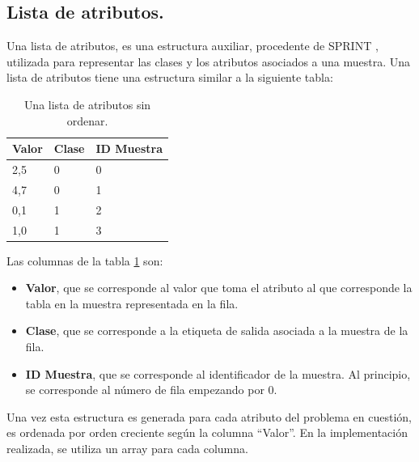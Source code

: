\subsection{Lista de atributos.}
Una lista de atributos, es una estructura auxiliar, procedente de SPRINT \cite{sprint}, utilizada para representar las clases y los atributos asociados a una muestra. Una lista de atributos tiene una estructura similar a la siguiente tabla:

\begin{table}[ht]
\centering
\begin{tabular}{@{}lll@{}}
\toprule
Valor & Clase & ID Muestra \\ \midrule
2,5   & 0     & 0          \\
4,7   & 0     & 1          \\
0,1   & 1     & 2          \\
1,0   & 1     & 3          \\ \bottomrule
\end{tabular}
\caption{Una lista de atributos sin ordenar.}
\label{tab:ejlistaatributos}
\end{table}

Las columnas de la tabla \ref{tab:ejlistaatributos} son:
\begin{itemize}
    \item \textbf{Valor}, que se corresponde al valor que toma el atributo al que corresponde la tabla en la muestra representada en la fila.
    \item \textbf{Clase}, que se corresponde a la etiqueta de salida asociada a la muestra de la fila.
    \item \textbf{ID Muestra}, que se corresponde al identificador de la muestra. Al principio, se corresponde al número de fila empezando por 0.
\end{itemize}

Una vez esta estructura es generada para cada atributo del problema en cuestión, es ordenada por orden creciente según la columna ``Valor''. En la implementación realizada, se utiliza un array para cada columna.

